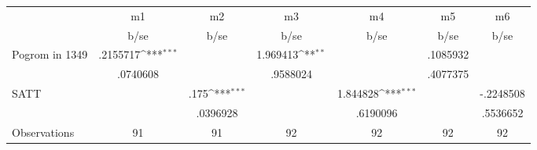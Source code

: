 {
\def\sym#1{\ifmmode^{#1}\else\(^{#1}\)\fi}
\begin{tabular}{l*{6}{c}}
\toprule
                &       m1         &       m2         &       m3         &       m4         &       m5         &       m6         \\
                &     b/se         &     b/se         &     b/se         &     b/se         &     b/se         &     b/se         \\
\midrule
Pogrom in 1349  & .2155717\sym{***}&                  & 1.969413\sym{**} &                  & .1085932         &                  \\
                & .0740608         &                  & .9588024         &                  & .4077375         &                  \\
SATT            &                  &     .175\sym{***}&                  & 1.844828\sym{***}&                  &-.2248508         \\
                &                  & .0396928         &                  & .6190096         &                  & .5536652         \\
\midrule
Observations    &       91         &       91         &       92         &       92         &       92         &       92         \\
\bottomrule
\end{tabular}
}
